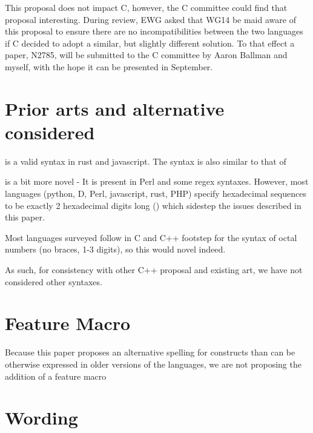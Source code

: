 \documentclass{wg21}
\begin{document}
This proposal does not impact C, however, the C committee could find that proposal interesting.
During review, EWG asked that WG14 be maid aware of this proposal to ensure there are no incompatibilities between the two languages if C
decided to adopt a similar, but slightly different solution.
To that effect a paper, N2785, will be submitted to the C committee by Aaron Ballman and myself, with the hope it can be presented in September.


\section{Prior arts and alternative considered}

 is a valid syntax in rust and javascript.
The syntax is also similar to that of 

 is a bit more novel - It is present in Perl and some regex syntaxes.
However, most languages (python, D, Perl, javascript, rust, PHP) specify hexadecimal sequences to be exactly 2 hexadecimal digits long () which sidestep the issues described in this paper.

Most languages surveyed follow in C and C++ footstep for the syntax of octal numbers (no braces, 1-3 digits), so this would novel indeed.

As such, for consistency with other C++ proposal and existing art, we have not considered other syntaxes.

\section{Feature Macro}

Because this paper proposes an alternative spelling for constructs than can be otherwise expressed in older versions of the languages,
we are not proposing the addition of a feature macro

\section{Wording}
\end{document}
